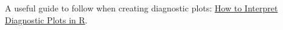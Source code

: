 \documentclass[a4paper]{article}
\begin{document}
    A useful guide to follow when creating diagnostic plots: \href{https://www.statology.org/diagnostic-plots-in-r/}{How to Interpret Diagnostic Plots in R}.



























    \newpage

    {}
    

    \newpage

    \printindex
\end{document}
